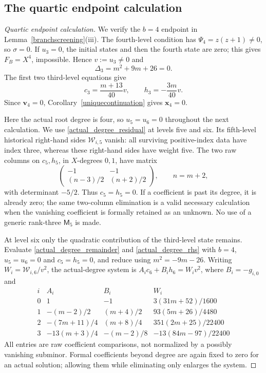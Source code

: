 \documentclass[12pt]{article}
\theoremstyle{remark}
\begin{document}
\subsection{The quartic endpoint calculation}\label{app:quartic}

\begin{proof}[Quartic endpoint calculation]
We verify the $b=4$ endpoint in Lemma~\ref{branchscreening}(iii).
The fourth-level condition has $\Psi_4=z(z+1)\ne0$, so $\sigma=0$.
If $u_3=0$, the initial states and then the fourth state are zero;
this gives $F_B=X^4$, impossible.  Hence $v:=u_3\ne0$ and
\begin{equation}\label{quarticDelta3}
 \Delta_3=m^2+9m+26=0.
\end{equation}
The first two third-level equations give
\begin{equation}\label{quarticc3h3}
 c_3=\frac{m+13}{40}v,\qquad h_3=-\frac{3m}{40}v.
\end{equation}
Since $\mathbf v_4=0$, Corollary~\ref{uniquecontinuation} gives
$\mathbf x_4=0$.

Here the actual root degree is four, so $u_5=u_6=0$ throughout the
next calculation.  We use \eqref{actual_degree_residual} at levels
five and six.  Its fifth-level historical right-hand sides
$\mathcal W_{i,5}$ vanish: all surviving positive-index data have index
three, whereas these right-hand sides have weight five.  The two raw
columns on $c_5,h_5$, in $X$-degrees $0,1$, have matrix
\[
 \begin{pmatrix}-1&-1\\(n-3)/2&(n+2)/2\end{pmatrix},
 \qquad n=m+2,
\]
with determinant $-5/2$.  Thus $c_5=h_5=0$.  If a coefficient is
past its degree, it is already zero; the same two-column elimination
is a valid necessary calculation when the vanishing coefficient is formally retained as an unknown.  No use of a generic rank-three $\mathsf M_5$ is made.

At level six only the quadratic contribution of the third-level state
remains.  Evaluate \eqref{actual_degree_remainder} and
\eqref{actual_degree_rhs} with $b=4$, $u_5=u_6=0$ and $c_5=h_5=0$,
and reduce using $m^2=-9m-26$.  Writing
$W_i=\mathcal W_{i,6}/v^2$, the actual-degree system is
$A_i c_6+B_i h_6=W_i v^2$, where $B_i=-g_{i,0}$ and
\begin{equation}\label{quartic_sixth_table}
\begin{array}{c|c|c|c}
 i&A_i&B_i&W_i\\ \hline
 0&1&-1&3(31m+52)/1600\\
 1&-(m-2)/2&(m+4)/2&93(5m+26)/4480\\
 2&-(7m+11)/4&(m+8)/4&351(2m+25)/22400\\
 3&-13(m+3)/4&-(m-2)/8&-13(84m-97)/22400
\end{array}
\end{equation}
All entries are raw coefficient comparisons, not normalized by a
possibly vanishing subminor.  Formal coefficients beyond degree are
again fixed to zero for an actual solution; allowing them while
eliminating only enlarges the system.


\end{proof}
\end{document}
